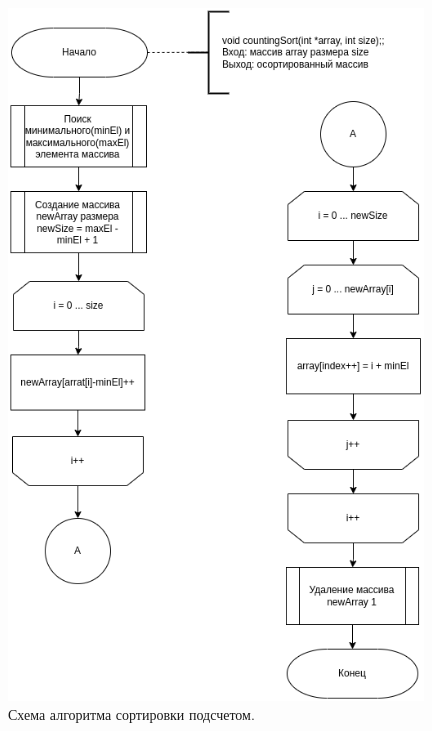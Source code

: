 \begin{figure}[h]
	\centering
	\includegraphics[width=110mm]{images/counting}
	\caption{Схема алгоритма сортировки подсчетом.}
	\label{img:counting}
\end{figure}

